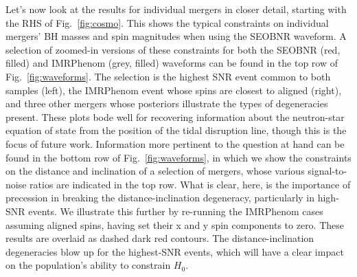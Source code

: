 \documentclass[twocolumn]{aastex63}
\begin{document}
\begin{figure*}[ht!]
\caption{Cosmological and population parameter posteriors inferred for the simulated SEOBNR (left) and IMRPhenom (right) NSBH samples.\label{fig:cosmo}}
\end{figure*}

Let's now look at the results for individual mergers in closer detail, starting with the RHS of Fig.~\ref{fig:cosmo}. This shows the typical constraints on individual mergers' BH masses and spin magnitudes when using the SEOBNR waveform. A selection of zoomed-in versions of these constraints for both the SEOBNR (red, filled) and IMRPhenom (grey, filled) waveforms can be found in the top row of Fig.~\ref{fig:waveforms}. The selection is the highest SNR event common to both samples (left), the IMRPhenom event whose spins are closest to aligned (right), and three other mergers whose posteriors illustrate the types of degeneracies present. These plots bode well for recovering information about the neutron-star equation of state from the position of the tidal disruption line, though this is the focus of future work. Information more pertinent to the question at hand can be found in the bottom row of Fig.~\ref{fig:waveforms}, in which we show the constraints on the distance and inclination of a selection of mergers, whose various signal-to-noise ratios are indicated in the top row. What is clear, here, is the importance of precession in breaking the distance-inclination degeneracy, particularly in high-SNR events. We illustrate this further by re-running the IMRPhenom cases assuming aligned spins, having set their x and y spin components to zero. These results are overlaid as dashed dark red contours. The distance-inclination degeneracies blow up for the highest-SNR events, which will have a clear impact on the population's ability to constrain $H_0$.

\begin{figure*}[ht!]
\caption{Posterior distributions for mergers simulated using the IMRPhenom waveform with precessing (grey filled) and aligned (dark red dashed) spins, and the SEOBNR waveform (red) with aligned spins. Each column depicts the distance, inclination, and black-hole mass and $z$-spin magnitude posteriors for a merger with true parameters indicated by black plus symbols (crosses where the true $z$-spin is negative). Shown are: (left) the merger with the highest signal-to-noise, (right) the two IMRPhenom mergers whose black-hole spins are closest to being aligned, and (center) two further mergers indicating the range of posteriors observed. \label{fig:waveforms}}
\end{figure*}
\end{document}

